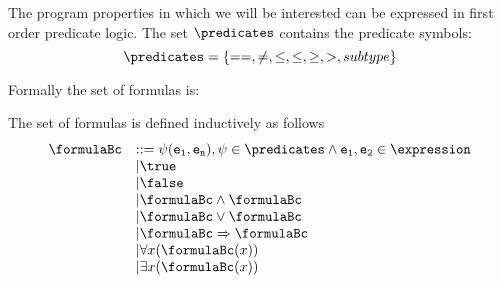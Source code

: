 

The program properties in which we will be interested can be expressed in first order predicate logic.
The set $\predicates$ contains the predicate symbols:
 $$\predicates = \{  ==, \neq, \leq, \le, \geq, >, subtype  \}$$
 
Formally the set of formulas is:
\begin{Formula}[Definition]
The set of formulas is defined inductively as follows
	$$
	\begin{array}{ll}
	\formulaBc & ::= \psi(\tt{e_1}, \tt{e_n}) , \psi \in \predicates \wedge \tt{e_1},\tt{e_2} \in \expression  \\
	  & \vert \true \\
	  & \vert  \false \\	
	  & \vert \formulaBc  \wedge  \formulaBc \\
	  & \vert \formulaBc \vee  \formulaBc \\
	  & \vert \formulaBc  \Rightarrow \formulaBc \\
	  & \vert \forall x  (\formulaBc(x) ) \\
	  & \vert \exists x  (\formulaBc(x))	 
	\end{array}
	$$ 
\end{Formula}


